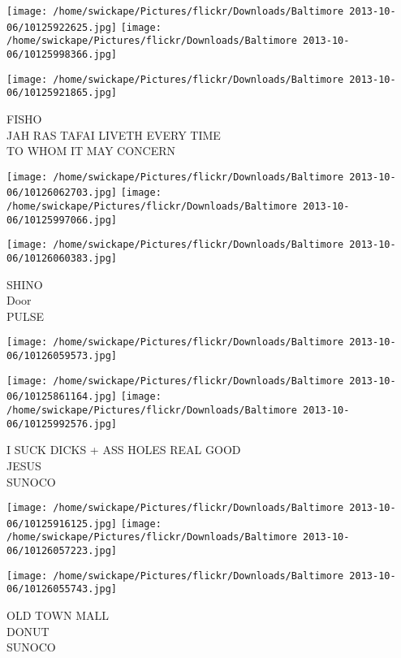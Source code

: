 \documentclass[10pt,letterpaper]{article}
\begin{document}
\texttt{[image: /home/swickape/Pictures/flickr/Downloads/Baltimore 2013-10-06/10125922625.jpg]}
\texttt{[image: /home/swickape/Pictures/flickr/Downloads/Baltimore 2013-10-06/10125998366.jpg]}

\vspace{0.25in}
\texttt{[image: /home/swickape/Pictures/flickr/Downloads/Baltimore 2013-10-06/10125921865.jpg]}

FISHO\\
JAH RAS TAFAI LIVETH EVERY TIME\\
TO WHOM IT MAY CONCERN\\
\pagebreak

\texttt{[image: /home/swickape/Pictures/flickr/Downloads/Baltimore 2013-10-06/10126062703.jpg]}
\texttt{[image: /home/swickape/Pictures/flickr/Downloads/Baltimore 2013-10-06/10125997066.jpg]}

\vspace{0.25in}
\texttt{[image: /home/swickape/Pictures/flickr/Downloads/Baltimore 2013-10-06/10126060383.jpg]}

SHINO\\
Door\\
PULSE\\
\pagebreak

\texttt{[image: /home/swickape/Pictures/flickr/Downloads/Baltimore 2013-10-06/10126059573.jpg]}

\vspace{0.25in}
\texttt{[image: /home/swickape/Pictures/flickr/Downloads/Baltimore 2013-10-06/10125861164.jpg]}
\texttt{[image: /home/swickape/Pictures/flickr/Downloads/Baltimore 2013-10-06/10125992576.jpg]}

I SUCK DICKS + ASS HOLES REAL GOOD\\
JESUS\\
SUNOCO\\
\pagebreak

\texttt{[image: /home/swickape/Pictures/flickr/Downloads/Baltimore 2013-10-06/10125916125.jpg]}
\texttt{[image: /home/swickape/Pictures/flickr/Downloads/Baltimore 2013-10-06/10126057223.jpg]}

\vspace{0.25in}
\texttt{[image: /home/swickape/Pictures/flickr/Downloads/Baltimore 2013-10-06/10126055743.jpg]}

OLD TOWN MALL\\
DONUT\\
SUNOCO\\
\pagebreak
\end{document}
